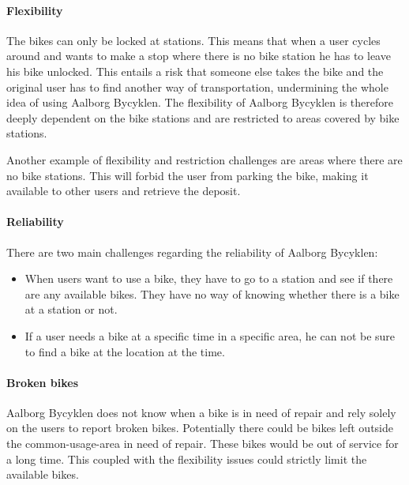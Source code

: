 \paragraph{Flexibility}
The bikes can only be locked at stations.
This means that when a user cycles around and wants to make a stop where there is no bike station he has to leave his bike unlocked.
This entails a risk that someone else takes the bike and the original user has to find another way of transportation, undermining the whole idea of using Aalborg Bycyklen.
The flexibility of Aalborg Bycyklen is therefore deeply dependent on the bike stations and are restricted to areas covered by bike stations.

Another example of flexibility and restriction challenges are areas where there are no bike stations. This will forbid the user from parking the bike, making it available to other users and retrieve the deposit.

\paragraph{Reliability}
There are two main challenges regarding the reliability of Aalborg Bycyklen:
\begin{itemize}
\item When users want to use a bike, they have to go to a station and see if there are any available bikes.
They have no way of knowing whether there is a bike at a station or not.
\item If a user needs a bike at a specific time in a specific area, he can not be sure to find a bike at the location at the time.
\end{itemize}

\paragraph{Broken bikes}
Aalborg Bycyklen does not know when a bike is in need of repair and rely solely on the users to report broken bikes.
Potentially there could be bikes left outside the common-usage-area in need of repair. These bikes would be out of service for a long time.
This coupled with the flexibility issues could strictly limit the available bikes.